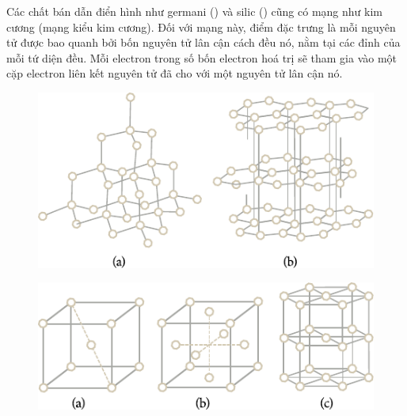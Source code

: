 
Các chất bán dẫn điển hình như germani () và silic () cũng có mạng như kim cương (mạng kiểu kim cương). Đối với mạng này, điểm đặc trưng là mỗi nguyên tử được bao quanh bởi bốn nguyên tử lân cận cách đều nó, nằm tại các đỉnh của mỗi tứ diện đều. Mỗi electron trong số bốn electron hoá trị sẽ tham gia vào một cặp electron liên kết nguyên tử đã cho với một nguyên tử lân cận nó.

\begin{figure}[!htb]
	\begin{center}
		\includegraphics[scale=1.0]{figures/ch_13/fig_13_6.pdf}
		\caption[]{}
		\label{fig:13_6}
	\end{center}
	\vspace{-0.4cm}
\end{figure}

\begin{figure}[!htb]
	\begin{center}
		\includegraphics[scale=1.0]{figures/ch_13/fig_13_7.pdf}
		\caption[]{}
		\label{fig:13_7}
	\end{center}
	\vspace{-0.8cm}
\end{figure}

